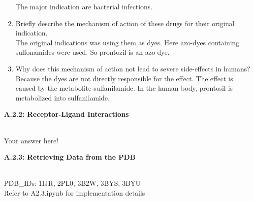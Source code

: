 \documentclass[a4paper,10pt]{article}
\begin{document}
\begin{enumerate}
    The major indication are bacterial infections. 
    \item Briefly describe the mechanism of action of these drugs for their original indication. \\
    The original indications was using them as dyes. Here azo-dyes containing sulfonamides were used. So prontozil is an azo-dye.
    \item Why does this mechanism of action not lead to severe side-effects in humans? \\
    Because the dyes are not directly responsible for the effect. The effect is caused by the metabolite sulfanilamide. In the human body, prontosil is metabolized into sulfanilamide. 
\end{enumerate}


\begin{large}
	\vspace{1.0cm}
	\textbf{A.2.2: Receptor-Ligand Interactions}
\end{large}	\\ [2mm]


Your answer here!


\begin{large}
	\vspace{1.0cm}
	\textbf{A.2.3: Retrieving Data from the PDB}
\end{large}	\\ [2mm]


PDB_IDs: 1IJR, 2PL0, 3B2W, 3BYS, 3BYU \\
Refer to A2.3.ipynb for implementation details



\end{document}
